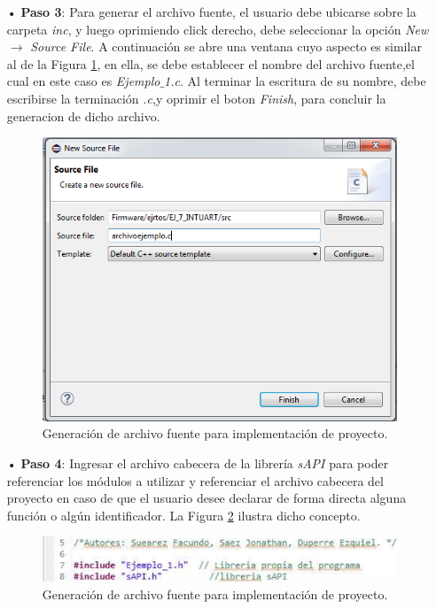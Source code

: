\documentclass[12pt,letterpaper]{article}
\begin{document}
\begin{enumerate}
\item[•]\textbf{Paso 3}: Para generar el archivo fuente, el usuario debe ubicarse sobre la carpeta \textit{inc}, y luego oprimiendo click derecho, debe seleccionar la opción \textit{New} $\rightarrow$ \textit{Source File}. A continuación se abre una ventana cuyo aspecto es similar al de la Figura \ref{archivofuentesapi1}, en ella, se debe establecer el nombre del archivo fuente,el cual en este caso es \textit{Ejemplo$\_$1.c}. Al terminar la escritura de su nombre, debe escribirse la terminación \textit{.c},y oprimir el boton \textit{Finish}, para concluir la generacion de dicho archivo.
\begin{figure}[!h]
\centering
\includegraphics[width=8 cm]{figuras/f28.png}
\caption{Generación de archivo fuente para implementación de proyecto.}
\label{archivofuentesapi1}
\end{figure}
\item[•]\textbf{Paso 4}: Ingresar el archivo cabecera de la librería \textit{sAPI} para poder referenciar los módulos a utilizar y referenciar el archivo cabecera del proyecto en caso de que el usuario desee declarar de forma directa alguna función o algún identificador. La Figura \ref{inclusionsapi1} ilustra dicho concepto.

\begin{figure}[!h]
\centering
\includegraphics[width=15 cm]{figuras/f2.png}
\caption{Generación de archivo fuente para implementación de proyecto.}
\label{inclusionsapi1}
\end{figure}


\end{enumerate}
\end{document}
